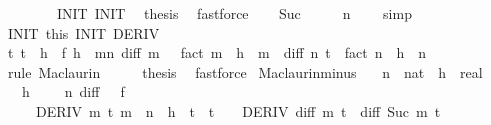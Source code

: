 \begin{isabellebody}
\ \ \isamarkupfalse%
\ {}\isanewline
\ \ \isamarkupfalse%
\ INIT{}\ INIT{}\ \isamarkupfalse%
\ {\isacharquery}{\kern0pt}thesis\ \isamarkupfalse%
\ fastforce\isanewline
{}\isamarkupfalse%
\isanewline
\ \ \isamarkupfalse%
\ Suc\isanewline
\ \ \isamarkupfalse%
\ \isamarkupfalse%
\ {\isachardoublequoteopen}n\ {\isachargreater}{\kern0pt}\ {}{\isachardoublequoteclose}\ \isamarkupfalse%
\ simp\isanewline
\ \ \isamarkupfalse%
\ INIT{}\ this\ INIT{}\ DERIV\isanewline
\ \ \isamarkupfalse%
\ {\isachardoublequoteopen}{\isasymexists}t{\isachargreater}{\kern0pt}{}{\isachardot}{\kern0pt}\ t\ {\isacharless}{\kern0pt}\ h\ {\isasymand}\ f\ h\ {\isacharequal}{\kern0pt}\ {\isacharparenleft}{\kern0pt}{\isasymSum}m{\isacharless}{\kern0pt}n{\isachardot}{\kern0pt}\ diff\ m\ {}\ {\isacharslash}{\kern0pt}\ fact\ m\ {\isacharasterisk}{\kern0pt}\ h\ {\isacharcircum}{\kern0pt}\ m{\isacharparenright}{\kern0pt}\ {\isacharplus}{\kern0pt}\ diff\ n\ t\ {\isacharslash}{\kern0pt}\ fact\ n\ {\isacharasterisk}{\kern0pt}\ h\ {\isacharcircum}{\kern0pt}\ n{\isachardoublequoteclose}\isanewline
\ \ \ \ \isamarkupfalse%
\ {\isacharparenleft}{\kern0pt}rule\ Maclaurin{\isacharparenright}{\kern0pt}\isanewline
\ \ \isamarkupfalse%
\ \isamarkupfalse%
\ {\isacharquery}{\kern0pt}thesis\ \isamarkupfalse%
\ fastforce\isanewline
{}\isamarkupfalse%
%
\endisatagproof
{\isafoldproof}%
%
\isadelimproof
\isanewline
%
\endisadelimproof
\isanewline
{}\isamarkupfalse%
\ Maclaurin{\isacharunderscore}{\kern0pt}minus{\isacharcolon}{\kern0pt}\isanewline
\ \ \ n\ {\isacharcolon}{\kern0pt}{\isacharcolon}{\kern0pt}\ nat\ \ h\ {\isacharcolon}{\kern0pt}{\isacharcolon}{\kern0pt}\ real\isanewline
\ \ \ {\isachardoublequoteopen}h\ {\isacharless}{\kern0pt}\ {}{\isachardoublequoteclose}\ {\isachardoublequoteopen}{}\ {\isacharless}{\kern0pt}\ n{\isachardoublequoteclose}\ {\isachardoublequoteopen}diff\ {}\ {\isacharequal}{\kern0pt}\ f{\isachardoublequoteclose}\isanewline
\ \ \ \ \ DERIV{\isacharcolon}{\kern0pt}\ {\isachardoublequoteopen}{\isasymforall}m\ t{\isachardot}{\kern0pt}\ m\ {\isacharless}{\kern0pt}\ n\ {\isasymand}\ h\ {\isasymle}\ t\ {\isasymand}\ t\ {\isasymle}\ {}\ {\isasymlongrightarrow}\ DERIV\ {\isacharparenleft}{\kern0pt}diff\ m{\isacharparenright}{\kern0pt}\ t\ {\isacharcolon}{\kern0pt}{\isachargreater}{\kern0pt}\ diff\ {\isacharparenleft}{\kern0pt}Suc\ m{\isacharparenright}{\kern0pt}\ t{\isachardoublequoteclose}\isanewline

\end{isabellebody}
